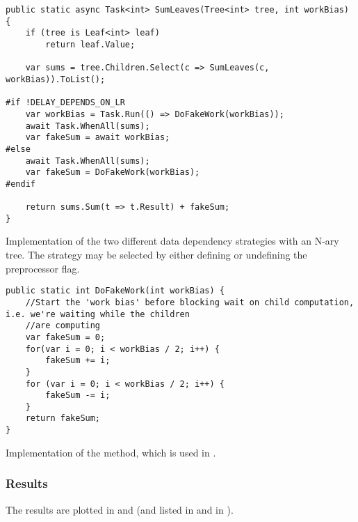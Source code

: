 \begin{listing}[H]
    \begin{verbatim}
public static async Task<int> SumLeaves(Tree<int> tree, int workBias)
{
    if (tree is Leaf<int> leaf)
        return leaf.Value;

    var sums = tree.Children.Select(c => SumLeaves(c, workBias)).ToList();

#if !DELAY_DEPENDS_ON_LR
    var workBias = Task.Run(() => DoFakeWork(workBias));
    await Task.WhenAll(sums);
    var fakeSum = await workBias;
#else
    await Task.WhenAll(sums);
    var fakeSum = DoFakeWork(workBias);
#endif

    return sums.Sum(t => t.Result) + fakeSum;
}
    \end{verbatim}
    \caption{Implementation of the two different data dependency strategies with an N-ary tree. The strategy may be selected by either defining or undefining the  preprocessor flag.}
    \label{lst:benchmark:strategies}
\end{listing}

\begin{listing}[H]
    \begin{verbatim}
public static int DoFakeWork(int workBias) {
    //Start the 'work bias' before blocking wait on child computation, i.e. we're waiting while the children
    //are computing
    var fakeSum = 0;
    for(var i = 0; i < workBias / 2; i++) {
        fakeSum += i;
    }
    for (var i = 0; i < workBias / 2; i++) {
        fakeSum -= i;
    }
    return fakeSum;
}
\end{verbatim}
\caption{Implementation of the  method, which is used in .}
\label{lst:benchmark:strategies-helper}
\end{listing}

\subsubsection{Results}
The results are plotted in  and  (and listed in  and  in ).

